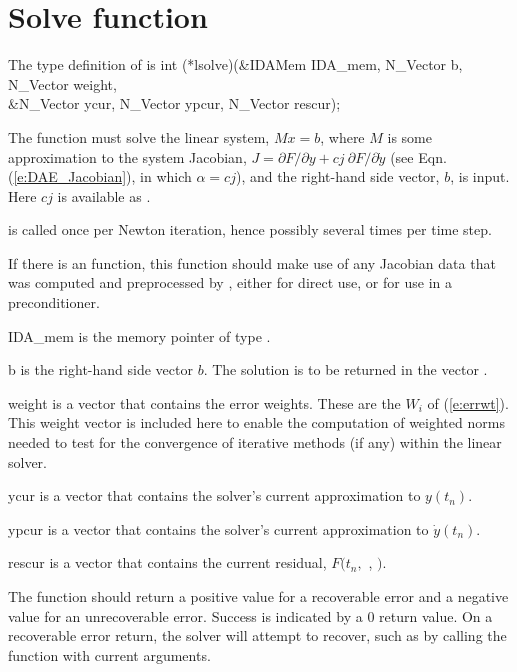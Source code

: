 
\section{Solve function}
The type definition of  is
{
  int (*lsolve)(&IDAMem IDA\_mem, N\_Vector b, N\_Vector weight, \\
                &N\_Vector ycur, N\_Vector ypcur, N\_Vector rescur);  
}
{
  The  function must solve the linear system, $M x = b$, where         
  $M$ is some approximation to the system Jacobian,
  $J = \partial F / \partial y + cj ~ \partial F / \partial \dot{y}$  
  (see Eqn. (\ref{e:DAE_Jacobian}), in which $\alpha = cj$),
  and the right-hand side vector, $b$, is input. 
  Here $cj$ is available as .

   is called once per Newton iteration, hence possibly
  several times per time step.

  If there is an  function, this  function should
  make use of any Jacobian data that was computed and preprocessed
  by , either for direct use, or for use in a preconditioner.
}
{
  \begin{args}
  \item[IDA\_mem]
    is the {\ida} memory pointer of type .
  \item[b]
    is the right-hand side vector $b$. The solution is to be    
    returned in the vector .
  \item[weight]
    is a vector that contains the error weights.
    These are the $W_i$ of (\ref{e:errwt}).
    This weight vector is included here to enable the computation of
    weighted norms needed to test for the convergence of iterative methods
    (if any) within the linear solver.
  \item[ycur]
    is a vector that contains the solver's current approximation to $y(t_n)$.
  \item[ypcur]
    is a vector that contains the solver's current approximation to $\dot{y}(t_n)$.
  \item[rescur]
    is a vector that contains the current residual, $F(t_n,$ , $)$. 
  \end{args}
}
{
  The  function should return a positive value    
  for a recoverable error and a negative value for an             
  unrecoverable error. Success is indicated by a 0 return value.
  On a recoverable error return, the solver will attempt to recover, such
  as by calling the  function with current arguments.
}
{}

